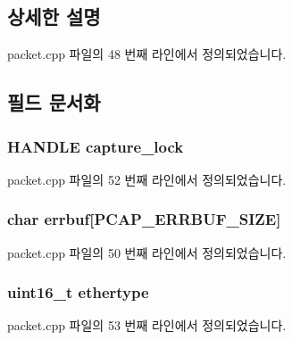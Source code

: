 \subsection{상세한 설명}


packet.\+cpp 파일의 48 번째 라인에서 정의되었습니다.



\subsection{필드 문서화}
\subsubsection[{\texorpdfstring{capture\+\_\+lock}{capture_lock}}]{\setlength{\rightskip}{0pt plus 5cm}H\+A\+N\+D\+LE capture\+\_\+lock}\hypertarget{structpacket__handle_a010ab438d7d926a405d3e65b0f36923a}{}\label{structpacket__handle_a010ab438d7d926a405d3e65b0f36923a}


packet.\+cpp 파일의 52 번째 라인에서 정의되었습니다.

\subsubsection[{\texorpdfstring{errbuf}{errbuf}}]{\setlength{\rightskip}{0pt plus 5cm}char errbuf\mbox{[}P\+C\+A\+P\+\_\+\+E\+R\+R\+B\+U\+F\+\_\+\+S\+I\+ZE\mbox{]}}\hypertarget{structpacket__handle_a41891cad090df07cd9360f1d8a9f1396}{}\label{structpacket__handle_a41891cad090df07cd9360f1d8a9f1396}


packet.\+cpp 파일의 50 번째 라인에서 정의되었습니다.

\subsubsection[{\texorpdfstring{ethertype}{ethertype}}]{\setlength{\rightskip}{0pt plus 5cm}uint16\+\_\+t ethertype}\hypertarget{structpacket__handle_aa9296c58dc24c63c4ee927db394a97d7}{}\label{structpacket__handle_aa9296c58dc24c63c4ee927db394a97d7}


packet.\+cpp 파일의 53 번째 라인에서 정의되었습니다.

